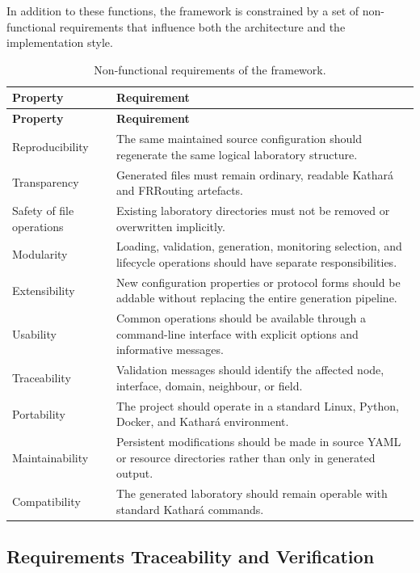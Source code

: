 In addition to these functions, the framework is constrained by a set of
non-functional requirements that influence both the architecture and the
implementation style.

\begin{longtable}{p{}p{}}
\caption{Non-functional requirements of the framework.}
\label{tab:non-functional-requirements}\\
\toprule
\textbf{Property} & \textbf{Requirement} \\
\midrule
\endfirsthead
\toprule
\textbf{Property} & \textbf{Requirement} \\
\midrule
\endhead
Reproducibility & The same maintained source configuration should regenerate the same logical laboratory structure. \\
Transparency & Generated files must remain ordinary, readable Kathar\'a and FRRouting artefacts. \\
Safety of file operations & Existing laboratory directories must not be removed or overwritten implicitly. \\
Modularity & Loading, validation, generation, monitoring selection, and lifecycle operations should have separate responsibilities. \\
Extensibility & New configuration properties or protocol forms should be addable without replacing the entire generation pipeline. \\
Usability & Common operations should be available through a command-line interface with explicit options and informative messages. \\
Traceability & Validation messages should identify the affected node, interface, domain, neighbour, or field. \\
Portability & The project should operate in a standard Linux, Python, Docker, and Kathar\'a environment. \\
Maintainability & Persistent modifications should be made in source YAML or resource directories rather than only in generated output. \\
Compatibility & The generated laboratory should remain operable with standard Kathar\'a commands. \\
\bottomrule
\end{longtable}

\subsection*{Requirements Traceability and Verification}
\label{sec:functional-requirements-traceability}

